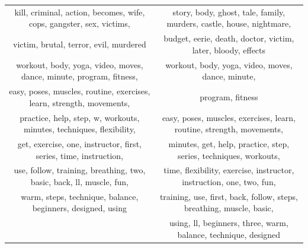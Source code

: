 \documentclass{article}
\begin{document}
\begin{tabular}{|c|c|}
\tabularnewline
kill, criminal, action, becomes, wife, cops, gangster, sex, victims, & story, body, ghost, tale, family, murders, castle, house, nightmare,
\tabularnewline
victim, brutal, terror, evil, murdered & budget, eerie, death, doctor, victim, later, bloody, effects
\tabularnewline
\hline 
workout, body, yoga, video, moves, dance, minute, program, fitness, & workout, body, yoga, video, moves, dance, minute,
\tabularnewline
easy, poses, muscles, routine, exercises, learn, strength, movements, & program, fitness
\tabularnewline
practice, help, step, w, workouts, minutes, techniques, flexibility, & easy, poses, muscles, exercises, learn, routine, strength, movements,
\tabularnewline
get, exercise, one, instructor, first, series, time, instruction, & minutes, get, help, practice, step, series, techniques, workouts,
\tabularnewline
use, follow, training, breathing, two, basic, back, ll, muscle, fun, & time, flexibility, exercise, instructor, instruction, one, two, fun,
\tabularnewline
warm, steps, technique, balance, beginners, designed, using & training, use, first, back, follow, steps, breathing, muscle, basic,
\tabularnewline
& using, ll, beginners, three, warm, balance, technique, designed\tabularnewline
\hline
\end{tabular}
\end{document}
